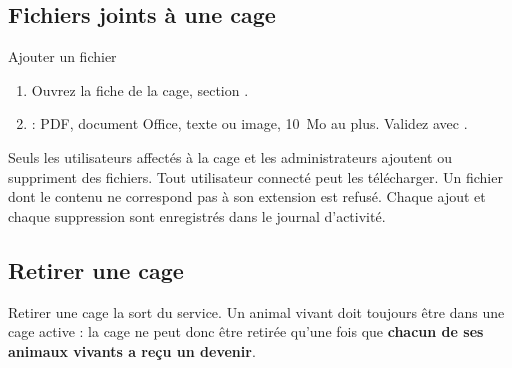 \documentclass[11pt,a4paper]{article}
\begin{document}
\subsection{Fichiers joints à une cage}
\begin{procedure}{Ajouter un fichier}
\begin{enumerate}
  \item Ouvrez la fiche de la cage, section .
  \item {} : PDF, document Office, texte ou image,
    10~Mo au plus. Validez avec .
\end{enumerate}
\end{procedure}
Seuls les utilisateurs affectés à la cage et les administrateurs ajoutent ou
suppriment des fichiers. Tout utilisateur connecté peut les télécharger. Un
fichier dont le contenu ne correspond pas à son extension est refusé. Chaque
ajout et chaque suppression sont enregistrés dans le journal d'activité.

\subsection{Retirer une cage}\label{sec:retrait}
Retirer une cage la sort du service. Un animal vivant doit toujours être dans
une cage active : la cage ne peut donc être retirée qu'une fois que
\textbf{chacun de ses animaux vivants a reçu un devenir}.
\end{document}
